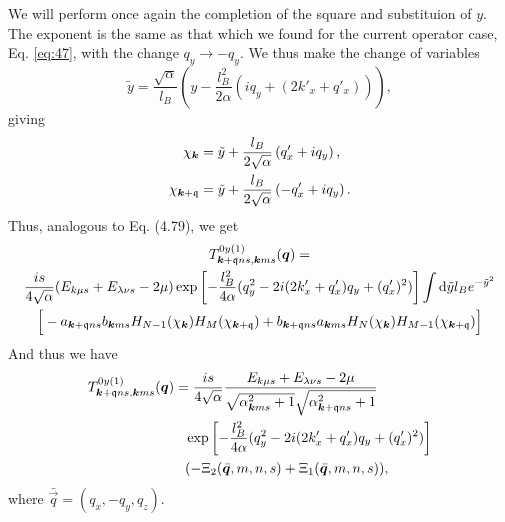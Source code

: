 We will perform once again the completion of the square and substituion of \(y\).
The exponent is the same as that which we found for the current operator case, Eq. \eqref{eq:47}, with the change \(q_{y} \to - q_{y}\).
We thus make the change of variables
\begin{equation}
  \label{eq:49}
  \tilde{y} = \frac{\sqrt{\alpha}}{l_{B}} \left(y  - \frac{l_{B}^2}{2 \alpha } (i q_{y} + (2k' _x + q' _x) )\right),
\end{equation}
giving
\begin{align}
  \chi _{\bm{k}} &= \tilde{y} + \frac{l_{B}}{2 \sqrt{\alpha }} \left( q'_x + i q_{y}\right),\\
  \chi _{\bm{k} + \mathfrak{q}} &= \tilde{y} + \frac{l_{B}}{2 \sqrt{\alpha }} \left( -q' _{x} + i q_{y}\right).
\end{align}
Thus, analogous to Eq. (4.79), we get
\begin{multline}
  \label{eq:50}
  T_{\bm{k} + \mathfrak{q} n s, \bm{k} m s}^{0y (1)} (\bm{q}) =\\
  \frac{is}{4 \sqrt{\alpha} }
  (E_{k\mu s} + E_{\lambda  \nu  s} - 2 \mu)
  \exp \left[
    -\frac{l_{B}^2}{4 \alpha } (q_{y}^2 - 2i (2 k' _x + q' _x) q_{y} + (q' _x)^2 )
  \right  ]
  \int \mathrm{d} \tilde{y} l_{B} e^{-\tilde{y}^2}\\
 \Big[
  - a_{\bm{k} + \mathfrak{q} ns} b_{\bm{k} m s}
  H_{N-1} ( \chi _{\bm{k}} )
  H_{M} ( \chi _{\bm{k} + \mathfrak{q}} )
  + b_{\bm{k} + \mathfrak{q} ns } a_{\bm{k} m s}
  H_{N}( \chi _{\bm{k}} )
  H_{M-1} ( \chi _{\bm{k} + \mathfrak{q}} )
  \Big]
\end{multline}
And thus we have
\begin{align}
  T_{\vec{k} + \qvec{q} n s, \vec{k} m s}^{0y (1)} (\vec{q}) &=
  \frac{is}{4 \sqrt{\alpha} }
  \frac{E_{k\mu s} + E_{\lambda  \nu  s} - 2 \mu}{
    \sqrt{\alpha _{\vec{k} m s}^2 + 1}
    \sqrt{\alpha _{\vec{k} + \qvec{q} n s}^2 + 1}
  }\\
  &\pe \exp \left[
    -\frac{l_{B}^2}{4 \alpha } (q_{y}^2 - 2i ( 2k' _x + q' _x ) q_{y} + (q' _x)^2)
  \right  ]\\
  &\pe (-\Xi_{2} (\bar{\vec{q}}, m, n, s) + \Xi_{1}(\bar{\vec{q}}, m, n, s)),
\end{align}
where \(\bar{\vec{q}} = (q_{x}, -q_{y}, q_{z})\).

